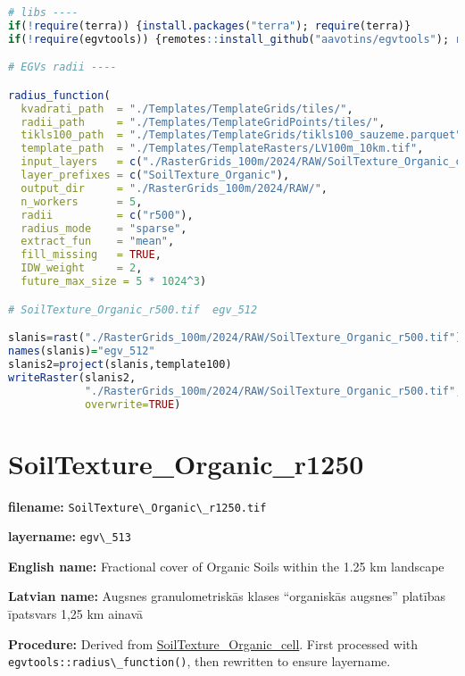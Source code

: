 \documentclass[
]{book}
\newcommand{\passthrough}[1]{#1}
\begin{document}
\begin{lstlisting}[language=R]
# libs ----
if(!require(terra)) {install.packages("terra"); require(terra)}
if(!require(egvtools)) {remotes::install_github("aavotins/egvtools"); require(egvtools)}

# EGVs radii ----

radius_function(
  kvadrati_path  = "./Templates/TemplateGrids/tiles/",
  radii_path     = "./Templates/TemplateGridPoints/tiles/",
  tikls100_path  = "./Templates/TemplateGrids/tikls100_sauzeme.parquet",
  template_path  = "./Templates/TemplateRasters/LV100m_10km.tif",
  input_layers   = c("./RasterGrids_100m/2024/RAW/SoilTexture_Organic_cell.tif"),
  layer_prefixes = c("SoilTexture_Organic"),
  output_dir     = "./RasterGrids_100m/2024/RAW/",
  n_workers      = 5,
  radii          = c("r500"),
  radius_mode    = "sparse",
  extract_fun    = "mean",
  fill_missing   = TRUE,
  IDW_weight     = 2,
  future_max_size = 5 * 1024^3)

# SoilTexture_Organic_r500.tif  egv_512

slanis=rast("./RasterGrids_100m/2024/RAW/SoilTexture_Organic_r500.tif")
names(slanis)="egv_512"
slanis2=project(slanis,template100)
writeRaster(slanis2,
            "./RasterGrids_100m/2024/RAW/SoilTexture_Organic_r500.tif",
            overwrite=TRUE)
\end{lstlisting}

\section{SoilTexture\_Organic\_r1250}\label{ch06.513}

\textbf{filename:} \passthrough{\lstinline!SoilTexture\_Organic\_r1250.tif!}

\textbf{layername:} \passthrough{\lstinline!egv\_513!}

\textbf{English name:} Fractional cover of Organic Soils within the 1.25 km landscape

\textbf{Latvian name:} Augsnes granulometriskās klases ``organiskās augsnes'' platības īpatsvars 1,25 km ainavā

\textbf{Procedure:} Derived from \hyperref[ch06.511]{SoilTexture\_Organic\_cell}. First processed
with \passthrough{\lstinline!egvtools::radius\_function()!}, then rewritten to ensure layername.
\end{document}
